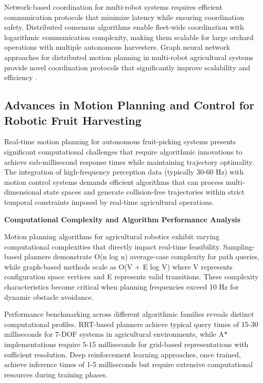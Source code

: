 \documentclass{ieeeaccess}
\begin{document}
Network-based coordination for multi-robot systems requires efficient communication protocols that minimize latency while ensuring coordination safety. Distributed consensus algorithms enable fleet-wide coordination with logarithmic communication complexity, making them scalable for large orchard operations with multiple autonomous harvesters. Graph neural network approaches for distributed motion planning in multi-robot agricultural systems provide novel coordination protocols that significantly improve scalability and efficiency .

\subsection{Advances in Motion Planning and Control for Robotic Fruit Harvesting}

Real-time motion planning for autonomous fruit-picking systems presents significant computational challenges that require algorithmic innovations to achieve sub-millisecond response times while maintaining trajectory optimality. The integration of high-frequency perception data (typically 30-60 Hz) with motion control systems demands efficient algorithms that can process multi-dimensional state spaces and generate collision-free trajectories within strict temporal constraints imposed by real-time agricultural operations.

\textbf{Computational Complexity and Algorithm Performance Analysis}

Motion planning algorithms for agricultural robotics exhibit varying computational complexities that directly impact real-time feasibility. Sampling-based planners demonstrate O(n log n) average-case complexity for path queries, while graph-based methods scale as O(V + E log V) where V represents configuration space vertices and E represents valid transitions. These complexity characteristics become critical when planning frequencies exceed 10 Hz for dynamic obstacle avoidance.

Performance benchmarking across different algorithmic families reveals distinct computational profiles. RRT-based planners achieve typical query times of 15-30 milliseconds for 7-DOF systems in agricultural environments, while A* implementations require 5-15 milliseconds for grid-based representations with sufficient resolution. Deep reinforcement learning approaches, once trained, achieve inference times of 1-5 milliseconds but require extensive computational resources during training phases.
\end{document}

